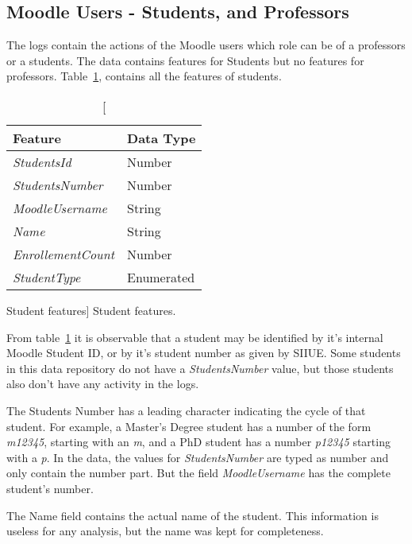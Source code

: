 \subsection{Moodle Users - Students, and Professors}
\label{ref:moodle_users}

The logs contain the actions of the Moodle users which role can be of a
professors or a students. The data contains features for Students but no
features for professors. Table~\ref{tab:students_features}, contains all the
features of students.

\begin{table}[h!]
    \centering

    \begin{tabular}{l l}
        Feature                   & Data Type  \\ \hline
        \textit{StudentsId}       & Number     \\
        \textit{StudentsNumber}   & Number     \\
        \textit{MoodleUsername}   & String     \\
        \textit{Name}             & String     \\
        \textit{EnrollementCount} & Number     \\
        \textit{StudentType}      & Enumerated \\
    \end{tabular}

    \caption
        [Student features]
        {Student features.}

    \label{tab:students_features}
\end{table}

From table~\ref{tab:students_features} it is observable that a student may be
identified by it's internal Moodle Student ID, or by it's student number as
given by SIIUE. Some students in this data repository do not have a
\textit{StudentsNumber} value, but those students also don't have any activity
in the logs.

The Students Number has a leading character indicating the cycle of that
student. For example, a Master's Degree student has a number of the form
\textit{m12345}, starting with an \textit{m}, and a PhD student has a number
\textit{p12345} starting with a \textit{p}. In the data, the values for
\textit{StudentsNumber} are typed as number and only contain the number part.
But the field \textit{MoodleUsername} has the complete student's number.

The Name field contains the actual name of the student. This information is
useless for any analysis, but the name was kept for completeness.

